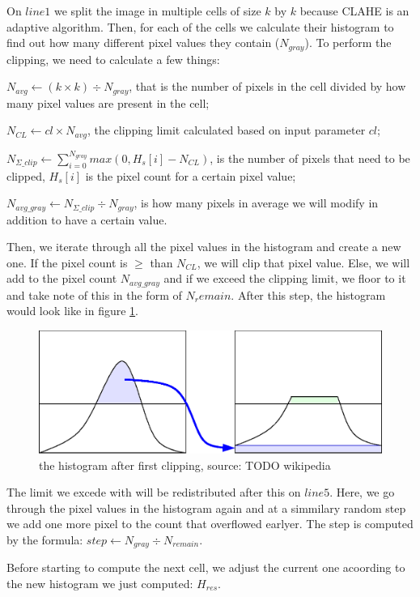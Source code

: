 On $line 1$ we split the image in multiple cells of size $k$ by $k$ because CLAHE is an adaptive algorithm.
Then, for each of the cells we calculate their histogram to find out how many different pixel values they contain ($N_{gray}$). To perform the clipping, we need to calculate a few things:

$N_{avg} \gets (k \times k) \div N_{gray}$, that is the number of pixels in the cell divided by how many pixel values are present in the cell;

$N_{CL} \gets cl \times N_{avg}$, the clipping limit calculated based on input parameter $cl$;

$N_{\Sigma\_clip} \gets \sum_{i=0}^{N_{gray}} max(0, H_s[i] - N_{CL})$, is the number of pixels that need to be clipped, $H_s[i]$ is the pixel count for a certain pixel value;

$N_{avg\_gray} \gets N_{\Sigma\_clip} \div N_{gray}$, is how many pixels in average we will modify in addition to have a certain value.

Then, we iterate through all the pixel values in the histogram and create a new one. If the pixel count is $\geq$ than $N_{CL}$, we will clip that pixel value. Else, we will add to the pixel count $N_{avg\_gray}$ and if we exceed the clipping limit, we floor to it and take note of this in the form of $N_remain$. After this step, the histogram would look like in figure \ref{fig:CLAHE_hist}.

\begin{figure}
    \centering
    \includegraphics[width=0.4\columnwidth]{img/algos/Clahe-redistribution.eps}
    \caption{the histogram after first clipping, source: TODO wikipedia}
    \label{fig:CLAHE_hist}
\end{figure}


The limit we excede with will be redistributed after this on $line 5$. Here, we go through the pixel values in the histogram again and at a simmilary random step we add one more pixel to the count that overflowed earlyer. The step is computed by the formula: $step \gets N_{gray} \div N_{remain}$.

Before starting to compute the next cell, we adjust the current one acoording to the new histogram we just computed: $H_{res}$.

